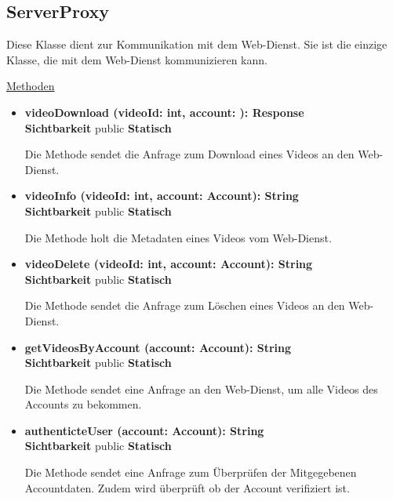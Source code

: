\newpage
\subsection{ServerProxy}\label{ServerProxy}

Diese Klasse dient zur Kommunikation mit dem Web-Dienst. Sie ist die einzige Klasse, die mit dem Web-Dienst kommunizieren kann.

\underline{Methoden}
\begin{itemize}
\itemsep0pt

\item \textbf{videoDownload (videoId: int, account: ): Response}\hfill\\
\textbf{Sichtbarkeit} public \newline
\textbf{Statisch}

Die Methode sendet die Anfrage zum Download eines Videos an den Web-Dienst.

\item \textbf{videoInfo (videoId: int, account: Account): String}\hfill\\
\textbf{Sichtbarkeit} public \newline
\textbf{Statisch}

Die Methode holt die Metadaten eines Videos vom Web-Dienst.

\item \textbf{videoDelete (videoId: int, account: Account): String}\hfill\\
\textbf{Sichtbarkeit} public \newline
\textbf{Statisch}

Die Methode sendet die Anfrage zum Löschen eines Videos an den Web-Dienst.

\item \textbf{getVideosByAccount (account: Account): String}\hfill\\
\textbf{Sichtbarkeit} public \newline
\textbf{Statisch}

Die Methode sendet eine Anfrage an den Web-Dienst, um alle Videos des Accounts zu bekommen.

\item \textbf{authenticteUser (account: Account): String}\hfill\\
\textbf{Sichtbarkeit} public \newline
\textbf{Statisch}

Die Methode sendet eine Anfrage zum Überprüfen der Mitgegebenen Accountdaten. Zudem wird überprüft ob der Account verifiziert ist.


\end{itemize}
